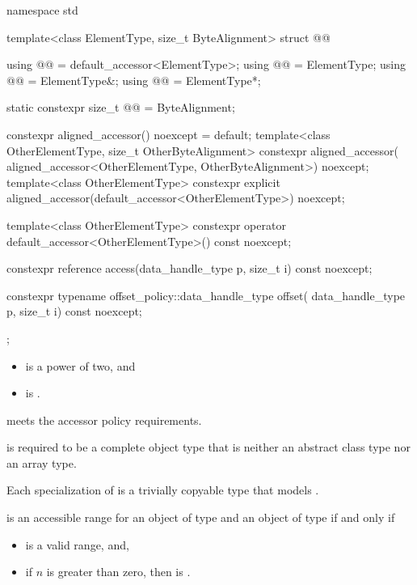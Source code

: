 \begin{codeblock}
namespace std {
  template<class ElementType, size_t ByteAlignment>
  struct @@ {
    using @@ = default_accessor<ElementType>;
    using @@ = ElementType;
    using @@ = ElementType&;
    using @@ = ElementType*;

    static constexpr size_t @@ = ByteAlignment;

    constexpr aligned_accessor() noexcept = default;
    template<class OtherElementType, size_t OtherByteAlignment>
      constexpr aligned_accessor(
        aligned_accessor<OtherElementType, OtherByteAlignment>) noexcept;
    template<class OtherElementType>
      constexpr explicit aligned_accessor(default_accessor<OtherElementType>) noexcept;

    template<class OtherElementType>
      constexpr operator default_accessor<OtherElementType>() const noexcept;

    constexpr reference access(data_handle_type p, size_t i) const noexcept;

    constexpr typename offset_policy::data_handle_type offset(
      data_handle_type p, size_t i) const noexcept;
  };
}
\end{codeblock}

\pnum
\mandates
\begin{itemize}
\item {} is a power of two, and
\item {} is .
\end{itemize}

\pnum
{} meets the accessor policy requirements.

\pnum
{} is required to be a complete object type
that is neither an abstract class type nor an array type.

\pnum
Each specialization of  is
a trivially copyable type that models .

\pnum
{} is an accessible range
for an object  of type  and
an object of type  if and only if
\begin{itemize}
\item
{} is a valid range, and,
\item
if $n$ is greater than zero,
then  is .
\end{itemize}

